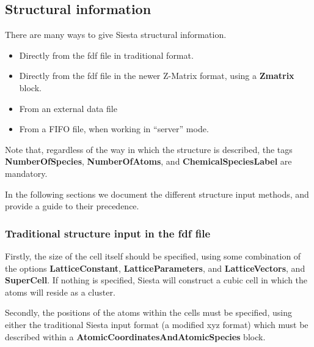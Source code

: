 \documentclass[11pt]{article}
\begin{document}
\vspace{5pt}
\subsection{Structural information}

There are many ways to give {\sc Siesta} structural information.

\begin{itemize}
\item Directly from the fdf file in traditional format.
\item Directly from the fdf file in the newer Z-Matrix format, using
a \textbf{Zmatrix} block.
\item From an external data file
\item From a FIFO file, when working in ``server'' mode.
\end{itemize}

Note that, regardless of the way in which the structure is described,
the tags
{\bf NumberOfSpecies}, 
{\bf NumberOfAtoms}, 
and {\bf ChemicalSpeciesLabel}
 are mandatory.

In the following sections we document the different structure input
methods, and provide a guide to their precedence.

\subsubsection{Traditional structure input in the fdf file}

Firstly, the size of the cell itself should be specified, using
some combination of the options
\textbf{LatticeConstant}, \textbf{LatticeParameters},
and \textbf{LatticeVectors}, and \textbf{SuperCell}.
If nothing is specified, {\sc Siesta} will construct a cubic
cell in which the atoms will reside as a cluster.

Secondly, the positions of the atoms within the cells
must be specified, using either the traditional {\sc Siesta}
input format (a modified xyz format) which must be described
within
a \textbf{AtomicCoordinatesAndAtomicSpecies} block.
\end{document}
